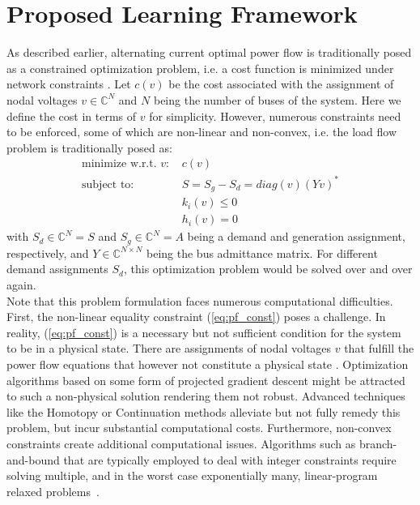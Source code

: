 \section{Proposed Learning Framework}
As described earlier, alternating current optimal power flow is traditionally posed as a constrained optimization problem, i.e. a cost function is minimized under network constraints \cite{carpentier1962contribution}. Let $c(v)$ be the cost associated with the assignment of nodal voltages $v \in \mathbb{C}^N$ and $N$ being the number of buses of the system. Here we define the cost in terms of $v$ for simplicity. However, numerous constraints need to be enforced, some of which are non-linear and non-convex, i.e. the load flow problem is traditionally posed as:
\begin{align}
\text{minimize w.r.t. $v$:\ }& c(v) \label{eq:lopf_erm_objective}\\
\text{subject to:\ }& S = S_{g} - S_{d} = diag(v)(Yv)^* \label{eq:pf_const}\\
 & k_i(v) \leq 0\\
 & h_i(v) = 0
\end{align}
with $S_d\in \mathbb{C}^N = S$ and $S_g\in \mathbb{C}^N = A$ being a demand and generation assignment, respectively, and $Y\in \mathbb{C}^{N \times N}$ being the bus admittance matrix.
For different demand assignments $S_d$, this optimization problem would be solved over and over again.\\
Note that this problem formulation faces numerous computational difficulties. First, the non-linear equality constraint (\ref{eq:pf_const}) poses a challenge. In reality, (\ref{eq:pf_const}) is a necessary but not sufficient condition for the system to be in a physical state. There are assignments of nodal voltages $v$ that fulfill the power flow equations that however not constitute a physical state \cite{tamura1983relationship,thorp1997load}. Optimization algorithms based on some form of projected gradient descent might be attracted to such a non-physical solution rendering them not robust. Advanced techniques like the Homotopy \cite{okumura1991solution} or Continuation \cite{milano2009continuous} methods alleviate but not fully remedy this problem, but incur substantial computational costs. Furthermore, non-convex constraints create additional computational issues. Algorithms such as branch-and-bound that are typically employed to deal with integer constraints require solving multiple, and in the worst case exponentially many, linear-program relaxed problems~\cite{lawler1966branch}.\\

